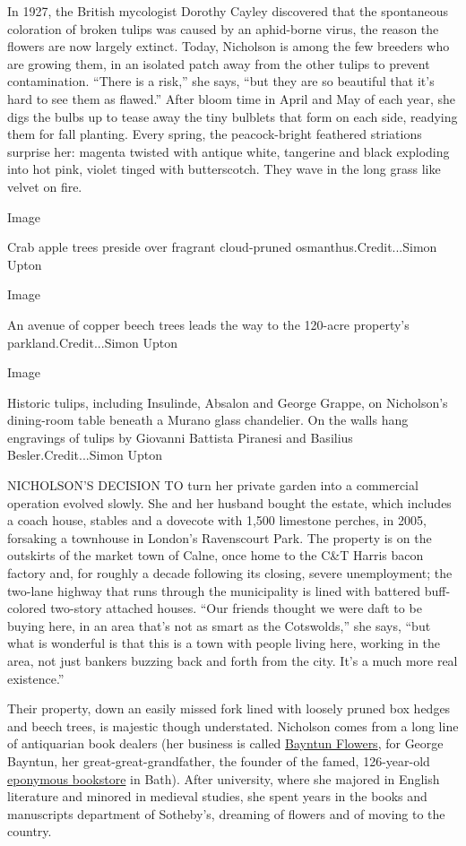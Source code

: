 In 1927, the British mycologist Dorothy Cayley discovered that the
spontaneous coloration of broken tulips was caused by an aphid-borne
virus, the reason the flowers are now largely extinct. Today, Nicholson
is among the few breeders who are growing them, in an isolated patch
away from the other tulips to prevent contamination. ``There is a
risk,'' she says, ``but they are so beautiful that it's hard to see them
as flawed.'' After bloom time in April and May of each year, she digs
the bulbs up to tease away the tiny bulblets that form on each side,
readying them for fall planting. Every spring, the peacock-bright
feathered striations surprise her: magenta twisted with antique white,
tangerine and black exploding into hot pink, violet tinged with
butterscotch. They wave in the long grass like velvet on fire.

Image

Crab apple trees preside over fragrant cloud-pruned
osmanthus.Credit...Simon Upton

Image

An avenue of copper beech trees leads the way to the 120-acre property's
parkland.Credit...Simon Upton

Image

Historic tulips, including Insulinde, Absalon and George Grappe, on
Nicholson's dining-room table beneath a Murano glass chandelier. On the
walls hang engravings of tulips by Giovanni Battista Piranesi and
Basilius Besler.Credit...Simon Upton

NICHOLSON'S DECISION TO turn her private garden into a commercial
operation evolved slowly. She and her husband bought the estate, which
includes a coach house, stables and a dovecote with 1,500 limestone
perches, in 2005, forsaking a townhouse in London's Ravenscourt Park.
The property is on the outskirts of the market town of Calne, once home
to the C\&T Harris bacon factory and, for roughly a decade following its
closing, severe unemployment; the two-lane highway that runs through the
municipality is lined with battered buff-colored two-story attached
houses. ``Our friends thought we were daft to be buying here, in an area
that's not as smart as the Cotswolds,'' she says, ``but what is
wonderful is that this is a town with people living here, working in the
area, not just bankers buzzing back and forth from the city. It's a much
more real existence.''

Their property, down an easily missed fork lined with loosely pruned box
hedges and beech trees, is majestic though understated. Nicholson comes
from a long line of antiquarian book dealers (her business is called
\href{https://www.instagram.com/bayntunflowers/?hl=en}{Bayntun Flowers},
for George Bayntun, her great-great-grandfather, the founder of the
famed, 126-year-old \href{http://www.georgebayntun.com/}{eponymous
bookstore} in Bath). After university, where she majored in English
literature and minored in medieval studies, she spent years in the books
and manuscripts department of Sotheby's, dreaming of flowers and of
moving to the country.

